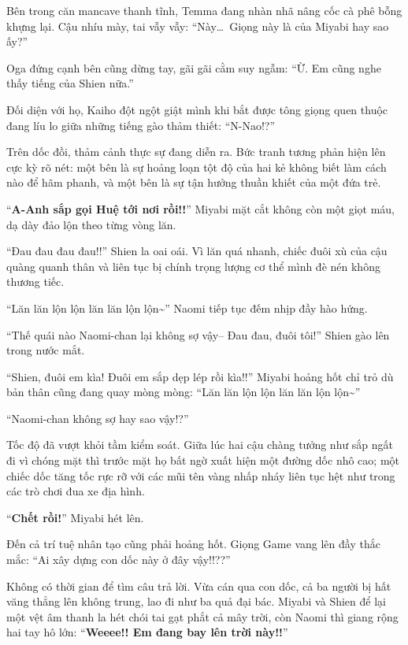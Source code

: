 \documentclass[../main.tex]{subfiles}
\begin{document}
Bên trong căn mancave thanh tĩnh, Temma đang nhàn nhã nâng cốc cà phê bỗng khựng lại. Cậu nhíu mày, tai vẫy vẫy: ``Này\dots\ Giọng này là của Miyabi hay sao ấy?''

Oga đứng cạnh bên cũng dừng tay, gãi gãi cằm suy ngẫm: ``Ừ. Em cũng nghe thấy tiếng của Shien nữa.''

Đối diện với họ, Kaiho đột ngột giật mình khi bắt được tông giọng quen thuộc đang líu lo giữa những tiếng gào thảm thiết: ``N-Nao!?''

Trên dốc đồi, thảm cảnh thực sự đang diễn ra. Bức tranh tương phản hiện lên cực kỳ rõ nét: một bên là sự hoảng loạn tột độ của hai kẻ không biết làm cách nào để hãm phanh, và một bên là sự tận hưởng thuần khiết của một đứa trẻ.


``\textbf{A-Anh sắp gọi Huệ tới nơi rồi!!}'' Miyabi mặt cắt không còn một giọt máu, dạ dày đảo lộn theo từng vòng lăn.

``Đau đau đau đau!!'' Shien la oai oái. Vì lăn quá nhanh, chiếc đuôi xù của cậu quàng quanh thân và liên tục bị chính trọng lượng cơ thể mình đè nén không thương tiếc.

``Lăn lăn lộn lộn lăn lăn lộn lộn\~{}'' Naomi tiếp tục đếm nhịp đầy hào hứng.

``Thế quái nào Naomi-chan lại không sợ vậy-- Đau đau, đuôi tôi!'' Shien gào lên trong nước mắt.

``Shien, đuôi em kìa! Đuôi em sắp dẹp lép rồi kìa!!'' Miyabi hoảng hốt chỉ trỏ dù bản thân cũng đang quay mòng mòng: ``Lăn lăn lộn lộn lăn lăn lộn lộn\~{}''

``Naomi-chan không sợ hay sao vậy!?''

Tốc độ đã vượt khỏi tầm kiểm soát. Giữa lúc hai cậu chàng tưởng như sắp ngất đi vì chóng mặt thì trước mặt họ bất ngờ xuất hiện một đường dốc nhô cao; một chiếc dốc tăng tốc rực rỡ với các mũi tên vàng nhấp nháy liên tục hệt như trong các trò chơi đua xe địa hình.

``\textbf{Chết rồi!}'' Miyabi hét lên.

Đến cả trí tuệ nhân tạo cũng phải hoảng hốt. Giọng Game vang lên đầy thắc mắc: ``Ai xây dựng con dốc này ở đây vậy!!??''

Không có thời gian để tìm câu trả lời. Vừa cán qua con dốc, cả ba người bị hất văng thẳng lên không trung, lao đi như ba quả đại bác. Miyabi và Shien để lại một vệt âm thanh la hét chói tai gạt phắt cả mây trời, còn Naomi thì giang rộng hai tay hô lớn: ``\textbf{Weeee!! Em đang bay lên trời này!!}''
\end{document}
